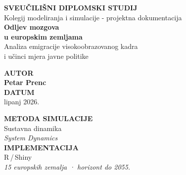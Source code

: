\documentclass[11pt,a4paper]{article}
\begin{document}
\begin{titlepage}
\noindent
\colorbox{primaryblue}{\parbox{\paperwidth}{%
  \vspace{2.6cm}
  \hspace{2.6cm}%
  \begin{minipage}{0.82\paperwidth}
    {\color{white}\footnotesize\bfseries\MakeUppercase{Sveučilišni diplomski studij}}\\[0.4em]
    {\color{white!70!primaryblue}\footnotesize Kolegij modeliranja i simulacije  - projektna dokumentacija}\\[2.2em]
    {\color{white}\fontsize{32}{38}\bfseries\selectfont Odljev mozgova\\[0.15em]
     u europskim zemljama}\\[1em]
    {\color{white!80!primaryblue}\large Analiza emigracije visokoobrazovanog kadra\\
     i učinci mjera javne politike}
  \end{minipage}%
  \vspace{2.2cm}
}}%
\noindent\colorbox{accentblue}{\parbox{\paperwidth}{\vspace{3pt}}}%
\vspace{2.2cm}

\hspace{2.6cm}%
\begin{minipage}{0.4\linewidth}
  {\small\color{darkgray}\MakeUppercase{\bfseries Autor}}\\[4pt]
  {\large\bfseries Petar Prenc}\\[1.6em]
  {\small\color{darkgray}\MakeUppercase{\bfseries Datum}}\\[4pt]
  {\large lipanj 2026.}
\end{minipage}%
\hfill
\begin{minipage}{0.38\linewidth}
  {\small\color{darkgray}\MakeUppercase{\bfseries Metoda simulacije}}\\[4pt]
  {\large Sustavna dinamika}\\
  {\small\color{darkgray}\textit{System Dynamics}}\\[1.6em]
  {\small\color{darkgray}\MakeUppercase{\bfseries Implementacija}}\\[4pt]
  {\large R\,/\,Shiny}\\
  {\small\color{darkgray}\textit{15 europskih zemalja · horizont do 2055.}}
\end{minipage}%
\hspace{1cm}

\vfill
\hspace{2.6cm}%

\vspace{1.2cm}
\restoregeometry
\end{titlepage}
\end{document}
